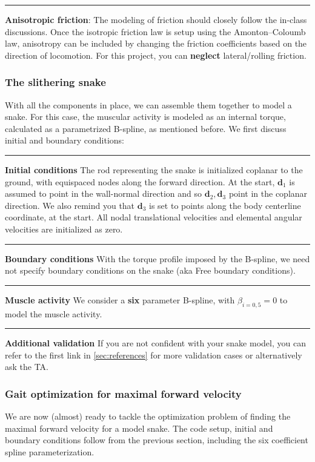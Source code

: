\documentclass[11pt]{article}
\begin{document}
\noindent\rule{1\textwidth}{0.01pt}
\textbf{Anisotropic friction}: The modeling of friction should closely follow
the in-class discussions. Once the isotropic friction law is setup using
the Amonton--Coloumb law, anisotropy can be included by changing the
friction coefficients based on the direction of locomotion.
For this project, you can \textbf{neglect} lateral/rolling friction.

\subsubsection{The slithering snake}
\label{sec:org52aed0e}
With all the components in place, we can assemble them together to model a
snake. For this case, the muscular activity
is modeled as an internal torque, calculated as a parametrized B-spline, as mentioned
before. We first discuss initial and boundary conditions:

\noindent\rule{1\textwidth}{0.01pt}
\textbf{Initial conditions} The rod representing the snake is initialized coplanar
to the ground, with equispaced nodes along the forward direction. At the start, \(\mathbf{d}_1\) is assumed
to point in the wall-normal direction and so \(\mathbf{d}_2, \mathbf{d}_3\) point in the coplanar direction. We also remind you that \(\mathbf{d}_3\) is
set to points along the body centerline coordinate, at the start. All nodal
translational velocities and elemental angular velocities are initialized as zero.

\noindent\rule{1\textwidth}{0.01pt}
\textbf{Boundary conditions} With the torque profile imposed by the B-spline, we
need not specify boundary conditions on the snake (aka Free boundary conditions).

\noindent\rule{1\textwidth}{0.01pt}
\textbf{Muscle activity} We consider a \textbf{six} parameter B-spline,
with \(\beta_{i=0,5}=0\) to model the muscle activity.

\noindent\rule{1\textwidth}{0.01pt}
\textbf{Additional validation} If you are not confident with your snake model, you
can refer to the first link in \cref{sec:references} for more validation cases or alternatively
ask the TA.

\subsubsection{Gait optimization for maximal forward velocity}
\label{sec:orgf2ace08}
We are now (almost) ready to tackle the optimization problem of finding the
maximal forward velocity for a model snake. The code setup, initial and
boundary conditions follow from the previous section, including the
six coefficient spline parameterization.
\end{document}

